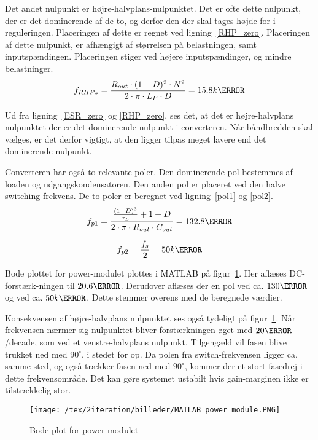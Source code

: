 \noindent Det andet nulpunkt er højre-halvplans-nulpunktet. Det er ofte dette nulpunkt, der er det dominerende af de to, og derfor den der skal tages højde for i reguleringen. Placeringen af dette er regnet ved ligning~\ref{RHP_zero}. Placeringen af dette nulpunkt, er afhængigt af størrelsen på belastningen, samt inputspændingen. Placeringen stiger ved højere inputspændinger, og mindre belastninger. 
\begin{equation} \label{RHP_zero}
f_{RHPz} = \frac{R_{out} \cdot (1-D)^2 \cdot N^2}{2 \cdot \pi \cdot L_P \cdot D} = 15.8k\hertz
\end{equation}

\noindent Ud fra ligning~\ref{ESR_zero} og \ref{RHP_zero}, ses det, at det er højre-halvplans nulpunktet der er det dominerende nulpunkt i converteren. Når båndbredden skal vælges, er det derfor vigtigt, at den ligger tilpas meget lavere end det dominerende nulpunkt.

Converteren har også to relevante poler. Den dominerende pol bestemmes af loaden og udgangskondensatoren. Den anden pol er placeret ved den halve switching-frekvens. De to poler er beregnet ved ligning~\ref{pol1} og \ref{pol2}.
\begin{equation} \label{pol1}
f_{p1} = \frac{\frac{(1-D)^3}{\tau_L} + 1 + D}{2\cdot \pi \cdot R_{out} \cdot C_{out}} = 132.8\hertz
\end{equation}

\begin{equation} \label{pol2}
f_{p2} = \frac{f_s}{2} = 50k\hertz
\end{equation}

\noindent Bode plottet for power-modulet plottes i MATLAB på figur~\ref{fig:MATLAB_power_module}. Her aflæses DC-forstærk-ningen til $20.6\decibel$. Derudover aflæses der en pol ved ca. $130\hertz$ og ved ca. $50k\hertz$. Dette stemmer overens med de beregnede værdier.

Konsekvensen af højre-halvplans nulpunktet ses også tydeligt på figur~\ref{fig:MATLAB_power_module}. Når frekvensen nærmer sig nulpunktet bliver forstærkningen øget med $20 \decibel$/decade, som ved et venstre-halvplans nulpunkt. Tilgengæld vil fasen blive trukket ned med $90^\circ$, i stedet for op. Da polen fra switch-frekvensen ligger ca. samme sted, og også trækker fasen ned med $90^\circ$, kommer der et stort fasedrej i dette frekvensområde. Det kan gøre systemet ustabilt hvis gain-marginen ikke er tilstrækkelig stor. 

\begin{figure}[H]
	\center
	\texttt{[image: /tex/2iteration/billeder/MATLAB\_power\_module.PNG]}
	\caption{Bode plot for power-modulet}
	\label{fig:MATLAB_power_module}
\end{figure}

